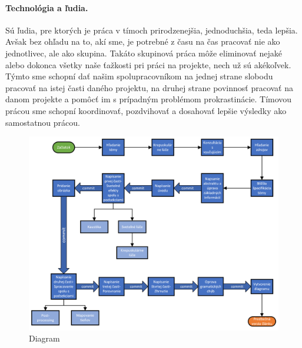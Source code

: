 \documentclass[10pt,twoside,slovak,a4paper]{article}
\begin{document}
\paragraph{Technológia a ľudia.} Sú ľudia, pre ktorých je práca v tímoch prirodzenejšia, 
jednoduchšia, teda lepšia. Avšak bez ohľadu na to, akí sme, je potrebné z času na čas 
pracovať nie ako jednotlivec, ale ako skupina. Takáto skupinová práca môže eliminovať nejaké 
alebo dokonca všetky naše ťažkosti pri práci na projekte, nech už sú akékoľvek. Týmto sme 
schopní dať našim spolupracovníkom na jednej strane slobodu pracovať na istej časti daného 
projektu, na druhej strane povinnosť pracovať na danom projekte a pomôcť im s prípadným 
problémom prokrastinácie. Tímovou prácou sme schopní koordinovať, pozdvihovať a dosahovať 
lepšie výsledky ako samostatnou prácou.







\begin{figure}[p]
    \centering
    \includegraphics[scale=0.8]{Kresba1.png}
    \caption{Diagram}
    \label{dia}
\end{figure}
\end{document}
